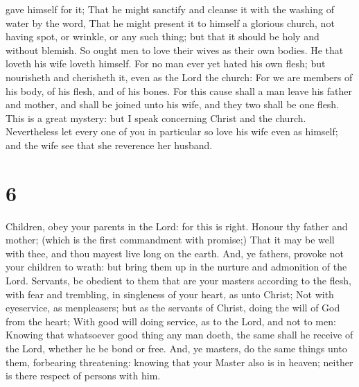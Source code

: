 gave himself for it;  That he might sanctify and cleanse
it with the washing of water by the word,  That he might
present it to himself a glorious church, not having spot, or wrinkle, or
any such thing; but that it should be holy and without blemish.
 So ought men to love their wives as their own bodies. He
that loveth his wife loveth himself.  For no man ever yet
hated his own flesh; but nourisheth and cherisheth it, even as the Lord
the church:  For we are members of his body, of his
flesh, and of his bones.  For this cause shall a man
leave his father and mother, and shall be joined unto his wife, and they
two shall be one flesh.  This is a great mystery: but I
speak concerning Christ and the church.  Nevertheless let
every one of you in particular so love his wife even as himself; and the
wife see that she reverence her husband.

\hypertarget{section-5}{%
\section{6}\label{section-5}}

 Children, obey your parents in the Lord: for this is
right.  Honour thy father and mother; (which is the first
commandment with promise;)  That it may be well with thee,
and thou mayest live long on the earth.  And, ye fathers,
provoke not your children to wrath: but bring them up in the nurture and
admonition of the Lord.  Servants, be obedient to them
that are your masters according to the flesh, with fear and trembling,
in singleness of your heart, as unto Christ;  Not with
eyeservice, as menpleasers; but as the servants of Christ, doing the
will of God from the heart;  With good will doing service,
as to the Lord, and not to men:  Knowing that whatsoever
good thing any man doeth, the same shall he receive of the Lord, whether
he be bond or free.  And, ye masters, do the same things
unto them, forbearing threatening: knowing that your Master also is in
heaven; neither is there respect of persons with him.


